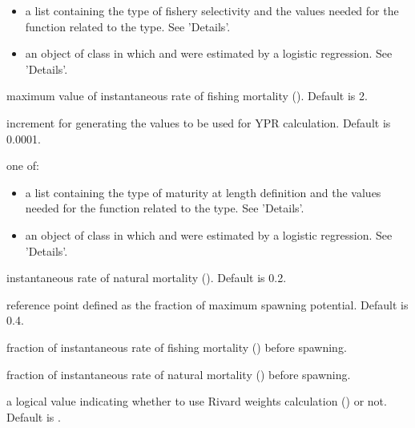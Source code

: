 \documentclass[a4paper]{book}
\begin{document}
\begin{Arguments}
\begin{ldescription}
\begin{itemize}
\item a list containing the type of fishery selectivity and the values needed for the function related to the type. See 'Details'. 
\item an object of class  in which \eqn{\alpha}{} and \eqn{\beta}{} were estimated by a logistic regression. See 'Details'.        

\end{itemize}


\item[\code{F.max}] maximum value of instantaneous rate of fishing mortality (). Default is 2.

\item[\code{F.incr.YPR}] increment for generating the  values to be used for YPR calculation. Default is 0.0001.

\item[\code{M.l}] one of:
\begin{itemize}

\item a list containing the type of maturity at length definition and the values needed for the function related to the type. See 'Details'. 
\item an object of class  in which \eqn{\alpha}{} and \eqn{\beta}{} were estimated by a logistic regression. See 'Details'.        

\end{itemize}


\item[\code{M}] instantaneous rate of natural mortality (). Default is 0.2.

\item[\code{f.MSP}] reference point defined as the fraction of maximum spawning potential. Default is 0.4.

\item[\code{F.f}] fraction of instantaneous rate of fishing mortality () before spawning.

\item[\code{M.f}] fraction of instantaneous rate of natural mortality () before spawning.

\item[\code{riv.calc}] a logical value indicating whether to use Rivard weights calculation () or not. Default is .

\end{ldescription}
\end{Arguments}
%
\end{document}

